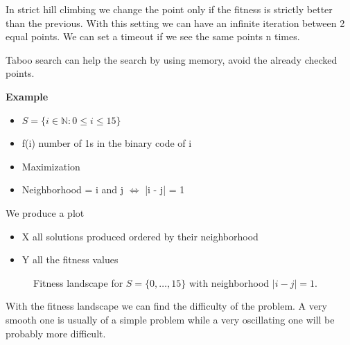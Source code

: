 In strict hill climbing we change the point only if the fitness is strictly better than the previous. With this setting we can have an infinite iteration between 2 equal points. We can set a timeout if we see the same points n times. 

Taboo search can help the search by using memory, avoid the already checked points. 

\vspace{10pt}

\textbf{Example}

\vspace{10pt}

\begin{itemize}
    \item $S = \{ i \in \mathbb{N} : 0 \le i \le 15 \}$
    \item  f(i) number of 1s in the binary code of i
    \item Maximization
    \item Neighborhood = i and j $\iff$ |i - j| = 1
\end{itemize}


We produce a plot

\begin{itemize}
    \item X \ra all solutions produced ordered by their neighborhood
    \item Y \ra all the fitness values
\end{itemize}

\begin{figure}[h!]
\centering
{}
\caption{Fitness landscape for $S=\{0,\dots,15\}$ with neighborhood $|i-j|=1$.}
\end{figure}

With the fitness landscape we can find the difficulty of the problem. A very smooth one is usually of a simple problem while a very oscillating one will be probably more difficult.


